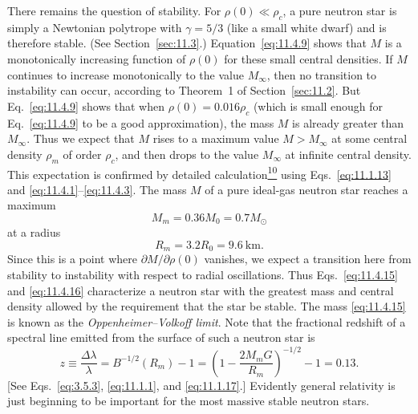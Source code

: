 There remains the question of stability. For \(\rho(0)\ll\rho_c\), a pure
neutron star is simply a Newtonian polytrope with \(\gamma=5/3\) (like a small
white dwarf) and is therefore stable. (See Section~\ref{sec:11.3}.)
Equation~\eqref{eq:11.4.9} shows that \(M\) is a monotonically increasing
function of \(\rho(0)\) for these small central densities. If \(M\) continues
to increase monotonically to the value \(M_\infty\), then no transition to
instability can occur, according to Theorem~1 of Section~\ref{sec:11.2}. But
Eq.~\eqref{eq:11.4.9} shows that when \(\rho(0)=0.016\rho_c\) (which is
small enough for Eq.~\eqref{eq:11.4.9} to be a good approximation), the mass
\(M\) is already greater than \(M_\infty\). Thus we expect that \(M\) rises
to a maximum value \(M>M_\infty\) at some central density \(\rho_m\) of order
\(\rho_c\), and then drops to the value \(M_\infty\) at infinite central
density. This expectation is confirmed by detailed
calculation\hyperref[ch11-ref-10]{\textsuperscript{10}} using
Eqs.~\eqref{eq:11.1.13} and
\eqref{eq:11.4.1}--\eqref{eq:11.4.3}. The mass \(M\) of a pure ideal-gas
neutron star reaches a maximum
\begin{equation}
  M_m=0.36M_0=0.7M_\odot
  \tag{11.4.15}\label{eq:11.4.15}
\end{equation}
at a radius
\begin{equation}
  R_m=3.2R_0=9.6\ \mathrm{km}.
  \tag{11.4.16}\label{eq:11.4.16}
\end{equation}
Since this is a point where \(\partial M/\partial\rho(0)\) vanishes, we
expect a transition here from stability to instability with respect to radial
oscillations. Thus Eqs.~\eqref{eq:11.4.15} and \eqref{eq:11.4.16}
characterize a neutron star with the greatest mass and central density allowed
by the requirement that the star be stable. The mass
\eqref{eq:11.4.15} is known as the \emph{Oppenheimer--Volkoff limit}. Note
that the fractional redshift of a spectral line emitted from the surface of
such a neutron star is
\begin{equation}
  z\equiv\frac{\Delta\lambda}{\lambda}
  =
  B^{-1/2}(R_m)-1
  =
  \left(1-\frac{2M_mG}{R_m}\right)^{-1/2}-1
  =
  0.13.
  \tag{11.4.17}\label{eq:11.4.17}
\end{equation}
[See Eqs.~\eqref{eq:3.5.3}, \eqref{eq:11.1.1}, and
\eqref{eq:11.1.17}.] Evidently general relativity is just beginning to be
important for the most massive stable neutron stars.

